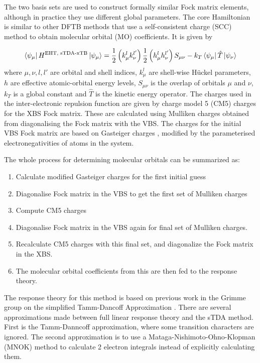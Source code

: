 The two basis sets are used to construct formally similar Fock matrix elements,
although in practice they use different global parameters. The core Hamiltonian
is similar to other DFTB methods that use a self-consistent charge (SCC) method 
to obtain molecular orbital (MO) coefficients. It is given by

\begin{equation}
\bra{\psi_\mu} H^{\text{EHT, sTDA-xTB}} \ket{\psi_\mu}= \frac{1}{2} \left(k^l_\mu k^{l'}_\nu\right) \frac{1}{2} \left(h^l_\mu h^{l'}_\nu\right) S_{\mu\nu} - k_T \bra{\psi_\mu}\hat{T}\ket{\psi_\nu}
\end{equation}
%
where $\mu,\nu,l,l'$ are orbital and shell indices, $k^l_\mu$ are shell-wise 
H{\"u}ckel parameters, $h$ are effective atomic-orbital energy levels, $S_{\mu\nu}$
is the overlap of orbitals $\mu$ and $\nu$, $k_T$ is a global constant and $\hat{T}$
is the kinetic energy operator. The charges used in the inter-electronic repulsion 
function are given by charge model 5 (CM5) \cite{Marenich2012} charges for the XBS
Fock matrix. These are calculated using Mulliken charges obtained from diagonalising
the Fock matrix with the VBS. The charges for the initial VBS Fock matrix are based
on Gasteiger charges \cite{Gasteiger1978}, modified by the parameterised
electronegativities of atoms in the system.

The whole process for determining molecular orbitals can be summarized as:
\begin{enumerate}
	\item Calculate modified Gasteiger charges for the first initial guess
	\item Diagonalise Fock matrix in the VBS to get the first set of Mulliken charges
	\item Compute CM5 charges
	\item Diagonalise Fock matrix in the VBS again for final set of Mulliken charges.
	\item Recalculate CM5 charges with this final set, and diagonalize the Fock matrix in the XBS. 
	\item The molecular orbital coefficients from this are then fed to the response theory.
\end{enumerate}

The response theory for this method is based on previous work in the Grimme group
on the simplified Tamm-Dancoff Approximation \cite{Grimme2013}. There are several
approximations made between full linear response theory and the sTDA method. First
is the Tamm-Danncoff approximation, where some transition characters are ignored. 
The second approximation is to use a Mataga-Nishimoto-Ohno-Klopman (MNOK) method 
to calculate 2 electron integrals instead of explicitly calculating them.

